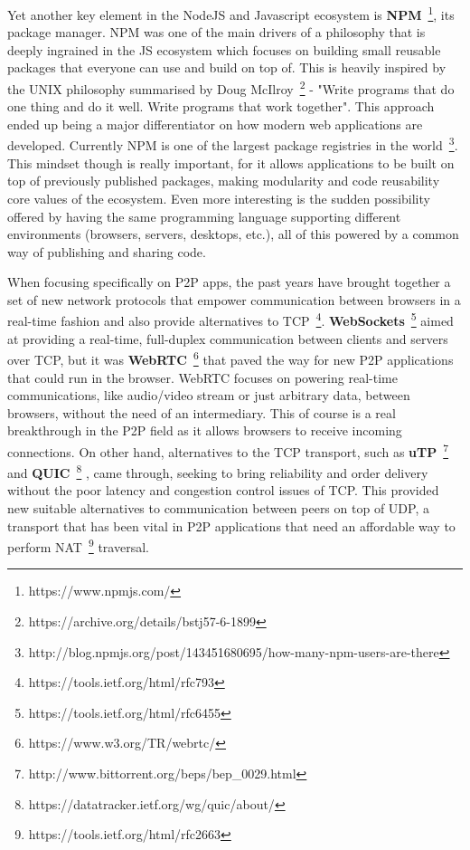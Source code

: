 Yet another key element in the NodeJS and Javascript ecosystem is
\textbf{NPM}~\footnote{https://www.npmjs.com/}, its package manager. NPM was one
of the main drivers of a philosophy that is deeply ingrained in the JS
ecosystem which focuses on building small reusable packages that
everyone can use and build on top of. This is heavily inspired by the
UNIX philosophy summarised by Doug McIlroy~\footnote{https://archive.org/details/bstj57-6-1899} - "Write
programs that do one thing and do it well. Write programs that work
together". This approach ended up being a major differentiator on how
modern web applications are developed. Currently NPM is one of the
largest package registries in the world~\footnote{http://blog.npmjs.org/post/143451680695/how-many-npm-users-are-there}.
This mindset though is really important, for it allows applications to
be built on top of previously published packages, making modularity and
code reusability core values of the ecosystem. Even more interesting is
the sudden possibility offered by having the same programming language
supporting different environments (browsers, servers, desktops, etc.),
all of this powered by a common way of publishing and sharing code.

When focusing specifically on P2P apps, the past years have brought
together a set of new network protocols that empower communication
between browsers in a real-time fashion and also provide alternatives to
TCP~\footnote{https://tools.ietf.org/html/rfc793}. \textbf{WebSockets}~\footnote{https://tools.ietf.org/html/rfc6455}
aimed at providing a real-time, full-duplex communication
between clients and servers over TCP, but it was \textbf{WebRTC}~\footnote{https://www.w3.org/TR/webrtc/}
that paved the way for new P2P applications that could
run in the browser. WebRTC focuses on powering real-time communications,
like audio/video stream or just arbitrary data, between browsers,
without the need of an intermediary. This of course is a real
breakthrough in the P2P field as it allows browsers to receive incoming
connections. On other hand, alternatives to the TCP transport, such as
\textbf{uTP}~\footnote{http://www.bittorrent.org/beps/bep\_0029.html} and
\textbf{QUIC}~\footnote{https://datatracker.ietf.org/wg/quic/about/}
, came through, seeking to bring reliability and order delivery
without the poor latency and congestion control issues of TCP. This
provided new suitable alternatives to communication between peers on top
of UDP, a transport that has been vital in P2P applications that need an
affordable way to perform NAT~\footnote{https://tools.ietf.org/html/rfc2663} traversal.

